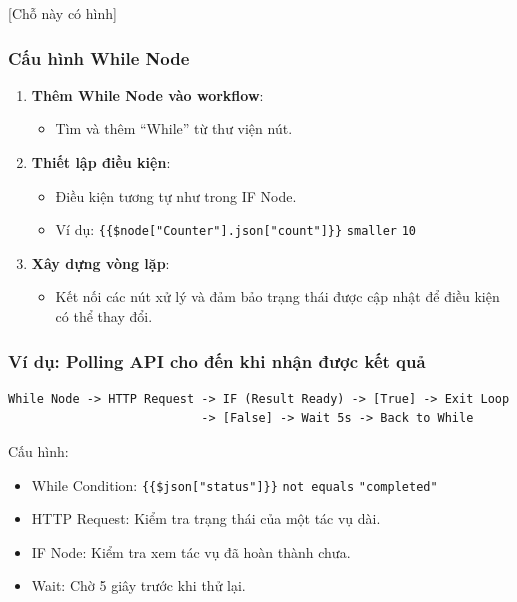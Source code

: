 [Chỗ này có hình]

\subsubsection{Cấu hình While Node}

\begin{enumerate}
  \item \textbf{Thêm While Node vào workflow}:
  \begin{itemize}
    \item Tìm và thêm ``While'' từ thư viện nút.
  \end{itemize}

  \item \textbf{Thiết lập điều kiện}:
  \begin{itemize}
    \item Điều kiện tương tự như trong IF Node.
    \item Ví dụ: \texttt{\{\{\$node["Counter"].json["count"]\}\}} \texttt{smaller} \texttt{10}
  \end{itemize}

  \item \textbf{Xây dựng vòng lặp}:
  \begin{itemize}
    \item Kết nối các nút xử lý và đảm bảo trạng thái được cập nhật để điều kiện có thể thay đổi.
  \end{itemize}
\end{enumerate}

\subsubsection{Ví dụ: Polling API cho đến khi nhận được kết quả}

\begin{verbatim}
While Node -> HTTP Request -> IF (Result Ready) -> [True] -> Exit Loop
                           -> [False] -> Wait 5s -> Back to While
\end{verbatim}

Cấu hình:
\begin{itemize}
  \item While Condition: \texttt{\{\{\$json["status"]\}\}} \texttt{not equals} \texttt{"completed"}
  \item HTTP Request: Kiểm tra trạng thái của một tác vụ dài.
  \item IF Node: Kiểm tra xem tác vụ đã hoàn thành chưa.
  \item Wait: Chờ 5 giây trước khi thử lại.
\end{itemize}


